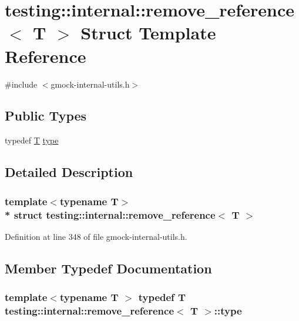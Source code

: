 \hypertarget{structtesting_1_1internal_1_1remove__reference}{}\section{testing\+:\+:internal\+:\+:remove\+\_\+reference$<$ T $>$ Struct Template Reference}
\label{structtesting_1_1internal_1_1remove__reference}


{\ttfamily \#include $<$gmock-\/internal-\/utils.\+h$>$}

\subsection*{Public Types}
\begin{DoxyCompactItemize}
\item 
typedef \hyperlink{functions__7_8js_adf1f3edb9115acb0a1e04209b7a9937b}{T} \hyperlink{structtesting_1_1internal_1_1remove__reference_a291edca52c59a0d211977d4802439b8a}{type}
\end{DoxyCompactItemize}


\subsection{Detailed Description}
\subsubsection*{template$<$typename T$>$\\*
struct testing\+::internal\+::remove\+\_\+reference$<$ T $>$}



Definition at line 348 of file gmock-\/internal-\/utils.\+h.



\subsection{Member Typedef Documentation}
\subsubsection[{\texorpdfstring{type}{type}}]{\setlength{\rightskip}{0pt plus 5cm}template$<$typename T $>$ typedef {\bf T} {\bf testing\+::internal\+::remove\+\_\+reference}$<$ {\bf T} $>$\+::{\bf type}}\hypertarget{structtesting_1_1internal_1_1remove__reference_a291edca52c59a0d211977d4802439b8a}{}\label{structtesting_1_1internal_1_1remove__reference_a291edca52c59a0d211977d4802439b8a}


